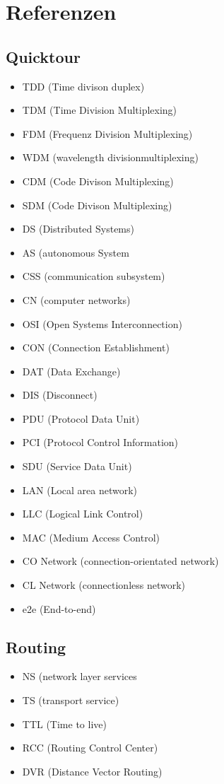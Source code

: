 \section{Referenzen}
    \subsection{Quicktour}
        \begin{itemize}
            \item TDD (Time divison duplex)
            \item TDM (Time Division Multiplexing)
            \item FDM (Frequenz Division Multiplexing)
            \item WDM (wavelength divisionmultiplexing)
            \item CDM (Code Divison Multiplexing)
            \item SDM (Code Divison Multiplexing)
            \item DS (Distributed Systems)
            \item AS (autonomous System
            \item CSS (communication subsystem)
            \item CN (computer networks)
            \item OSI (Open Systems Interconnection)
            \item CON (Connection Establishment)
            \item DAT (Data Exchange)
            \item DIS (Disconnect)
            \item PDU (Protocol Data Unit) 
            \item PCI (Protocol Control Information) 
            \item SDU (Service Data Unit)
            \item LAN (Local area network)
            \item LLC (Logical Link Control)
            \item MAC (Medium Access Control)
            \item CO Network (connection-orientated network)
            \item CL Network (connectionless network)
            \item e2e (End-to-end)
        \end{itemize}
    \subsection{Routing}
        \begin{itemize}
            \item NS (network layer services
            \item TS (transport service)
            \item TTL (Time to live)
            \item RCC (Routing Control Center)
            \item DVR (Distance Vector Routing)
        \end{itemize}